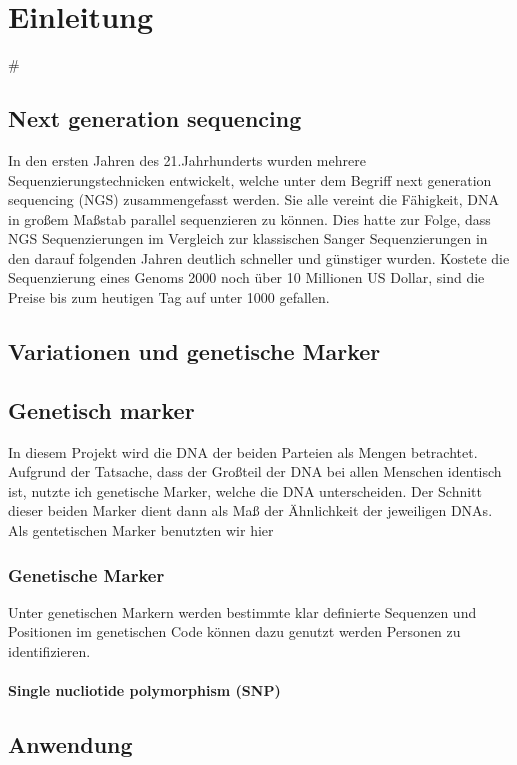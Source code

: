 \chapter{Einleitung}
\label{sec:Chapter1}#


\section{Next generation sequencing}
In den ersten Jahren des 21.Jahrhunderts wurden mehrere Sequenzierungstechnicken entwickelt, welche unter dem Begriff next generation sequencing (NGS) zusammengefasst werden.
Sie alle vereint die Fähigkeit, DNA in großem Maßstab parallel sequenzieren zu können. 
Dies hatte zur Folge, dass NGS Sequenzierungen im Vergleich zur klassischen Sanger Sequenzierungen in den darauf folgenden Jahren deutlich schneller und günstiger wurden.
Kostete die Sequenzierung eines Genoms 2000 noch über 10 Millionen US Dollar, sind die Preise bis zum heutigen Tag auf unter 1000 gefallen.
  
\section{Variationen und genetische Marker} 

  
\section{Genetisch marker}
In diesem Projekt wird die DNA der beiden Parteien als Mengen betrachtet.
Aufgrund der Tatsache, dass der Großteil der DNA bei allen Menschen identisch ist, nutzte ich genetische Marker, welche die DNA unterscheiden.
Der Schnitt dieser beiden Marker dient  dann als Maß der Ähnlichkeit  der jeweiligen DNAs.
Als gentetischen Marker benutzten wir hier 
\subsection{Genetische Marker}

Unter genetischen Markern werden bestimmte klar definierte Sequenzen und Positionen im genetischen Code können dazu genutzt werden Personen zu identifizieren.

\subsubsection{ Single nucliotide polymorphism (SNP)}



\section{Anwendung}

